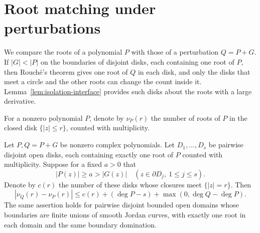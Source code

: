 \section{Root matching under perturbations}\label{sec:matching}

We compare the roots of a polynomial $P$ with those of a perturbation
$Q=P+G$. If $|G|<|P|$ on the boundaries of disjoint disks, each
containing one root of $P$, then Rouch\'e's theorem gives one root of $Q$
in each disk, and only the disks that meet a circle and the other roots
can change the count inside it. Lemma~\ref{lem:isolation-interface}
provides such disks about the roots with a large derivative.

For a nonzero polynomial $P$, denote by $\nu_P(r)$ the number of roots of
$P$ in the closed disk $\{|z|\le r\}$, counted with multiplicity.

\begin{theorem}\label{thm:T4}
Let $P,Q=P+G$ be nonzero complex polynomials.
Let $D_1,\ldots,D_s$ be pairwise disjoint open disks, each containing
exactly one root of $P$ counted with multiplicity.  Suppose for a fixed
$a>0$ that
\[
 |P(z)|\geq a>|G(z)|\quad(z\in\partial D_j,\ 1\leq j\leq s).
\]
Denote by $c(r)$ the number of these disks whose closures meet $\{|z|=r\}$.
Then
\begin{equation}
 |\nu_Q(r)-\nu_P(r)|\leq c(r)+(\deg P-s)+\max(0,\deg Q-\deg P). \label{eq:T4}
\end{equation}
The same assertion holds for pairwise disjoint bounded open domains
whose boundaries are finite unions of smooth Jordan curves, with
exactly one root in each domain and the same boundary domination.
\end{theorem}

